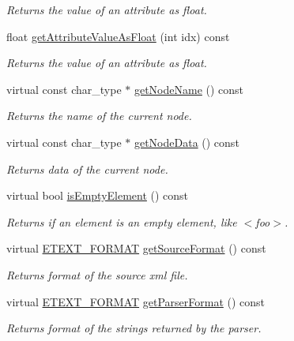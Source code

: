 \begin{CompactItemize}
\begin{CompactList}\small\item\em Returns the value of an attribute as float. \item\end{CompactList}\item 
float \hyperlink{classirr_1_1io_1_1_c_x_m_l_reader_impl_14d3f55dd2260b970525336713b8270e}{getAttributeValueAsFloat} (int idx) const 
\begin{CompactList}\small\item\em Returns the value of an attribute as float. \item\end{CompactList}\item 
virtual const char\_\-type $\ast$ \hyperlink{classirr_1_1io_1_1_c_x_m_l_reader_impl_30ddc03ee634ed0dbeef25547677f2da}{getNodeName} () const 
\begin{CompactList}\small\item\em Returns the name of the current node. \item\end{CompactList}\item 
virtual const char\_\-type $\ast$ \hyperlink{classirr_1_1io_1_1_c_x_m_l_reader_impl_c661ef32418a004c1ec3b6e02c9615df}{getNodeData} () const 
\begin{CompactList}\small\item\em Returns data of the current node. \item\end{CompactList}\item 
virtual bool \hyperlink{classirr_1_1io_1_1_c_x_m_l_reader_impl_17154683d277084155fe6c5556cc0672}{isEmptyElement} () const 
\begin{CompactList}\small\item\em Returns if an element is an empty element, like $<$foo$>$. \item\end{CompactList}\item 
virtual \hyperlink{namespaceirr_1_1io_c7e51e5a6bd00451dec248f497b16a9d}{ETEXT\_\-FORMAT} \hyperlink{classirr_1_1io_1_1_c_x_m_l_reader_impl_0947ce3e44eb7c324ff1bdb430dedfa8}{getSourceFormat} () const 
\begin{CompactList}\small\item\em Returns format of the source xml file. \item\end{CompactList}\item 
virtual \hyperlink{namespaceirr_1_1io_c7e51e5a6bd00451dec248f497b16a9d}{ETEXT\_\-FORMAT} \hyperlink{classirr_1_1io_1_1_c_x_m_l_reader_impl_dc53297eecc7760721a6bd4d3875c12b}{getParserFormat} () const 
\begin{CompactList}\small\item\em Returns format of the strings returned by the parser. \item\end{CompactList}\end{CompactItemize}



